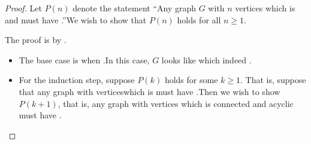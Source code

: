 \documentclass{tufte-handout}
\begin{document}
\begin{proof}
  Let $P(n)$ denote the statement ``Any graph $G$ with $n$ vertices
  which is \blank and \blank\linebreak
  must have \blank.''\linebreak  We wish to show
  that $P(n)$ holds for all $n \geq 1$.

  The proof is by \blank.
  \begin{itemize}
  \item The base case is when \blank.\linebreak In this case, $G$
    looks like \blank\linebreak which indeed \blank.
  \item For the induction step, suppose $P(k)$ holds for some $k \geq
    1$.  That is, suppose that any graph with \blank vertices\linebreak which is
    \blank\linebreak must have \blank.\linebreak  Then we wish to show
    $P(k+1)$, that is, any graph with \blank\linebreak vertices which is
    connected and acyclic must have \blank.


\end{itemize}
\end{proof}
\end{document}
